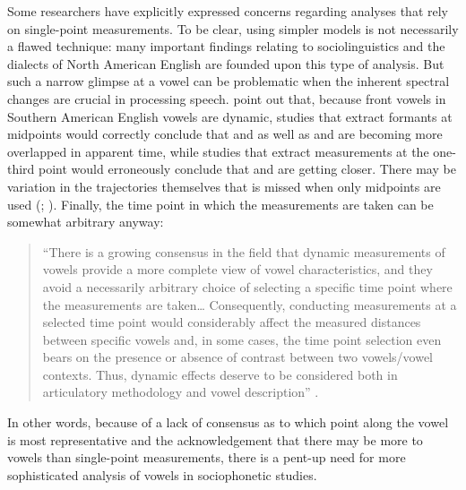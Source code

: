 Some researchers have explicitly expressed concerns regarding analyses that rely on single-point measurements. To be clear, using simpler models is not necessarily a flawed technique: many important findings relating to sociolinguistics and the dialects of North American English are founded upon this type of analysis. But such a narrow glimpse at a vowel can be problematic when the inherent spectral changes are crucial in processing speech. \citet{renwick_stanley_2020} point out that, because front vowels in Southern American English vowels are dynamic, studies that extract formants at midpoints would correctly conclude that \fleece and \kit as well as \face and \dress are becoming more overlapped in apparent time, while studies that extract measurements at the one-third point would erroneously conclude that \kit and \face are getting closer. There may be variation in the trajectories themselves that is missed when only midpoints are used (\citealt[57]{swan_2016_diss}; \citealt[288]{jacewicz_etal_2006}). Finally, the time point in which the measurements are taken can be somewhat arbitrary anyway:
\begin{quote}
    ``There is a growing consensus in the field that dynamic measurements of vowels provide a more complete view of vowel characteristics, and they avoid a necessarily arbitrary choice of selecting a specific time point where the measurements are taken… Consequently, conducting measurements at a selected time point would considerably affect the measured distances between specific vowels and, in some cases, the time point selection even bears on the presence or absence of contrast between two vowels/vowel contexts. Thus, dynamic effects deserve to be considered both in articulatory methodology and vowel description'' \citep[330]{strycharczuk_scobbie_2017}.
\end{quote}
In other words, because of a lack of consensus as to which point along the vowel is most representative and the acknowledgement that there may be more to vowels than single-point measurements, there is a pent-up need for more sophisticated analysis of vowels in sociophonetic studies.


